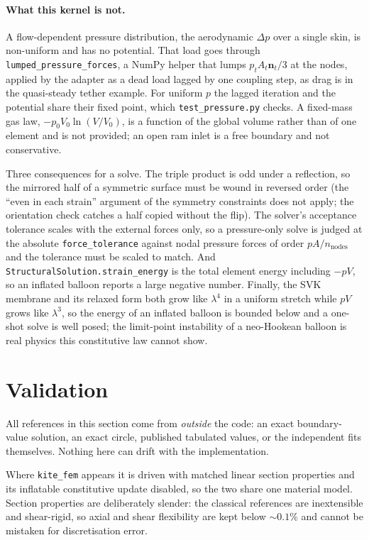 \documentclass[11pt,a4paper]{article}
\newcommand{\code}[1]{\texttt{\small #1}}
\begin{document}
\paragraph{What this kernel is not.} A flow-dependent pressure distribution,
the aerodynamic $\Delta p$ over a single skin, is non-uniform and has no
potential. That load goes through \code{lumped\_pressure\_forces}, a NumPy
helper that lumps $p_tA_t\mathbf{n}_t/3$ at the nodes, applied by the adapter
as a dead load lagged by one coupling step, as drag is in the quasi-steady
tether example. For uniform $p$ the lagged iteration and the potential share
their fixed point, which \code{test\_pressure.py} checks. A fixed-mass gas law,
$-p_0V_0\ln(V/V_0)$, is a function of the global volume rather than of one
element and is not provided; an open ram inlet is a free boundary and not
conservative.

Three consequences for a solve. The triple product is odd under a reflection,
so the mirrored half of a symmetric surface must be wound in reversed order
(the ``even in each strain'' argument of the symmetry constraints does not
apply; the orientation check catches a half copied without the flip). The
solver's acceptance tolerance scales with the external forces only, so a
pressure-only solve is judged at the absolute \code{force\_tolerance} against
nodal pressure forces of order $pA/n_{\text{nodes}}$ and the tolerance must be
scaled to match. And \code{StructuralSolution.strain\_energy} is the total
element energy including $-pV$, so an inflated balloon reports a large
negative number. Finally, the SVK membrane and its relaxed form both grow like
$\lambda^4$ in a uniform stretch while $pV$ grows like $\lambda^3$, so the
energy of an inflated balloon is bounded below and a one-shot solve is well
posed; the limit-point instability of a neo-Hookean balloon is real physics
this constitutive law cannot show.

\section{Validation}
\label{sec:validation}

All references in this section come from \emph{outside} the code: an exact
boundary-value solution, an exact circle, published tabulated values, or the
independent fits themselves. Nothing here can drift with the implementation.

Where \code{kite\_fem} appears it is driven with matched linear section
properties and its inflatable constitutive update disabled, so the two share one
material model. Section properties are deliberately slender: the classical
references are inextensible and shear-rigid, so axial and shear flexibility are
kept below $\sim0.1\%$ and cannot be mistaken for discretisation error.
\end{document}
